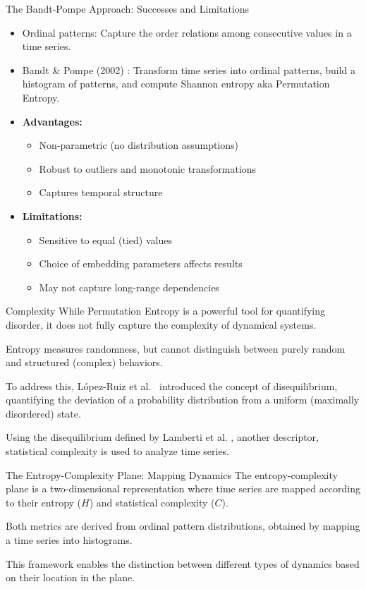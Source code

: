 \documentclass{beamer}
\begin{document}
\begin{frame}{The Bandt-Pompe Approach: Successes and Limitations}
	\begin{itemize}
		\item \alert{Ordinal patterns:} Capture the order relations among consecutive values in a time series.
		\item \alert{Bandt \& Pompe (2002) \cite{PhysRevLett.88.174102}:} Transform time series into ordinal patterns, build a histogram of patterns, and compute Shannon entropy aka Permutation Entropy.
		\item \textbf{Advantages:}
		\begin{itemize}
			\item Non-parametric (no distribution assumptions)
			\item Robust to outliers and monotonic transformations
			\item Captures temporal structure
		\end{itemize}
		\item \textbf{Limitations:}
		\begin{itemize}
			\item Sensitive to equal (tied) values
			\item Choice of embedding parameters affects results
			\item May not capture long-range dependencies
		\end{itemize}
	\end{itemize}
\end{frame}


\begin{frame}{Complexity}
	While Permutation Entropy is a powerful tool for quantifying disorder, it does not fully capture the complexity of dynamical systems.
	
	Entropy measures randomness, but cannot distinguish between purely random and structured (complex) behaviors.
	
	To address this, López-Ruiz et al.~\cite{lopez1995statistical} introduced the concept of \alert{disequilibrium}, quantifying the deviation of a probability distribution from a uniform (maximally disordered) state.
	
	Using the disequilibrium defined by Lamberti et al. \cite{lamberti2004intensive}, another descriptor, statistical complexity is used to analyze time series.  
\end{frame}

\begin{frame}{The Entropy-Complexity Plane: Mapping Dynamics}
	The \alert{entropy-complexity plane} is a two-dimensional representation where time series are mapped according to their entropy ($H$) and statistical complexity ($C$).
	
	Both metrics are derived from ordinal pattern distributions, obtained by mapping a time series into histograms.
	
	This framework enables the distinction between different types of dynamics based on their location in the plane.
\end{frame}
\end{document}
